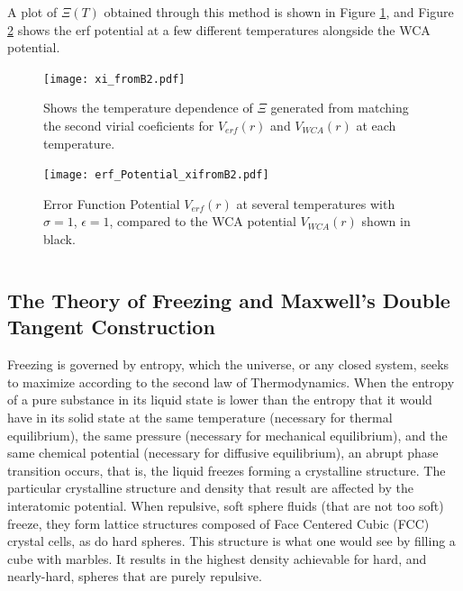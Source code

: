 \documentclass[double,12pt]{beavtex}
\begin{document}
A plot of $\Xi(T)$ obtained through this method is shown in Figure \ref{fig:xi_fromB2vsT}, and Figure \ref{fig:erf_Potential_xifromB2} shows the erf potential at a few different temperatures alongside the WCA potential. 

\begin{figure}[h!]
    \centering
    \texttt{[image: xi\_fromB2.pdf]}
    \caption{Shows the temperature dependence of $\Xi$ generated from matching the second virial coeficients for $V_{erf}(r)$ and $V_{WCA}(r)$ at each temperature.}
    \label{fig:xi_fromB2vsT}
  \end{figure}


\begin{figure}[h!]
    \centering
    \texttt{[image: erf\_Potential\_xifromB2.pdf]}
    \caption{Error Function Potential $V_{erf}(r)$ at several temperatures with $\sigma=1$, $\epsilon=1$, compared to the WCA potential $V_{WCA}(r)$ shown in black.}
    \label{fig:erf_Potential_xifromB2}
  \end{figure}



\[\]
\subsection{The Theory of Freezing and Maxwell's Double Tangent Construction}

Freezing is governed by entropy, which the universe, or any closed system, seeks to maximize according to the second law of Thermodynamics. When the entropy of a pure substance in its liquid state is lower than the entropy that it would have in its solid state at the same temperature (necessary for thermal equilibrium), the same pressure (necessary for mechanical equilibrium), and the same chemical potential (necessary for diffusive equilibrium), an abrupt phase transition occurs, that is, the liquid freezes forming a crystalline structure. The particular crystalline structure and density that result are affected by the interatomic potential. When repulsive, soft sphere fluids (that are not too soft) freeze, they form lattice structures composed of Face Centered Cubic (FCC) crystal cells, as do hard spheres. %
This structure is what one would see by filling a cube with marbles. It results in the highest density achievable for hard, and nearly-hard, spheres that are purely repulsive. 
\end{document}
